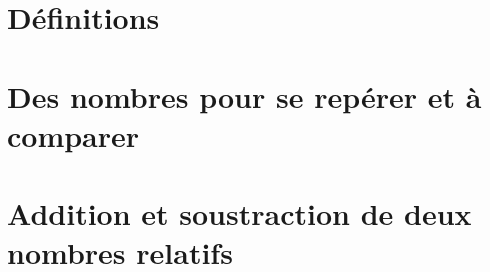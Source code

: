 \documentclass[12pt,a4paper]{article}
\date{}
\title{}
\begin{document}







\section{Définitions}



\newpage

\section{Des nombres pour se repérer et à comparer}



\section{Addition et soustraction de deux nombres relatifs}


\end{document}
